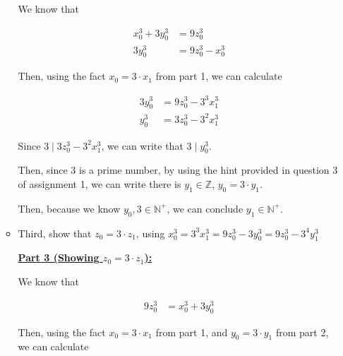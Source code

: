 \documentclass[12pt]{article}
\begin{document}
\begin{mdframed}
\begin{enumerate}[1.]
\begin{itemize}
\begin{mdframed}
            \bigskip

            We know that

            \begin{align}
                x_0^3 + 3y_0^3 &= 9z_0^3\\
                3y_0^3 &= 9z_0^3 - x_0^3
            \end{align}

            \bigskip

            Then, using the fact $x_0 = 3 \cdot x_1$ from part 1, we can calculate

            \begin{align}
                3y_0^3 &= 9z_0^3 - 3^3x_1^3\\
                y_0^3 &= 3z_0^3 - 3^2x_1^3
            \end{align}

            \bigskip

            Since $3 \mid 3z_0^3 - 3^2x_1^3$, we can write that $3 \mid y_0^3$.

            \bigskip

            Then, since 3 is a prime number, by using the hint provided in question 3
            of assignment 1, we can write there is $y_1 \in \mathbb{Z}$, $y_0 = 3 \cdot y_1$.

            \bigskip

            Then, because we know $y_0, 3 \in \mathbb{N}^+$, we can conclude
            $y_1 \in \mathbb{N}^+$.

            \end{mdframed}

            \item Third, show that $z_0 = 3 \cdot z_1$, using $x_0^3 = 3^3 x_1^3 = 9z_0^3 - 3y_0^3 =  9z_0^3 - 3^4y_1^3$

            \begin{mdframed}
            \underline{\textbf{Part 3 (Showing $z_0 = 3 \cdot z_1$):}}

            \bigskip

            We know that

            \begin{align}
                9z_0^3 &= x_0^3 + 3y_0^3
            \end{align}

            \bigskip

            Then, using the fact $x_0 = 3 \cdot x_1$ from part 1, and
            $y_0 = 3 \cdot y_1$ from part 2, we can calculate


\end{mdframed}
\end{itemize}
\end{enumerate}
\end{mdframed}
\end{document}
